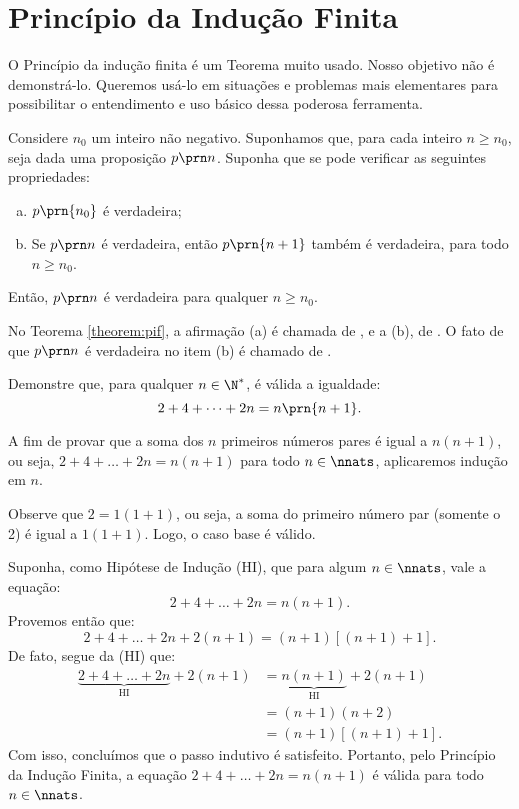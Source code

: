 \section{Princípio da Indução Finita}

O Princípio da indução finita é um Teorema muito usado. Nosso objetivo não é demonstrá-lo. Queremos usá-lo em situações e problemas mais elementares para possibilitar o entendimento e uso básico dessa poderosa ferramenta.

\begin{theorem}
\label{theorem:pif}
Considere $n_0$ um inteiro não negativo. Suponhamos que, para cada inteiro $n \geq n_0$, seja dada uma proposição $p \prn n$. Suponha
que se pode verificar as seguintes propriedades:

\begin{enumerate}[(a)]
  \item $p \prn{n_0}$ é verdadeira;
  \item Se $p \prn n$ é verdadeira, então $p \prn {n+1}$ também
  é verdadeira, para todo $n \geq n_0$.
\end{enumerate}

\noindent Então, $p \prn n$ é verdadeira para qualquer $n \geq n_0$.
\end{theorem}

\begin{remark}
No Teorema \ref{theorem:pif}, a afirmação (a) é chamada de , e a (b), de . O fato de que $p \prn n$ é verdadeira no item (b) é chamado de .
\end{remark}

\begin{example}
Demonstre que, para qualquer $n \in \N^*$, é válida a igualdade:
%
$$2+ 4+ \dots + 2n = n \prn {n+1}.$$
\end{example}


\begin{solution}
	A fim de provar que a soma dos $n$ primeiros números pares é igual a $n(n+1)$, ou seja, $2+4+\dots + 2n = n(n+1)$ para todo $n \in \nnats$, aplicaremos indução em $n$.
	
	Observe que $2 = 1(1+1)$, ou seja, a soma do primeiro número par (somente o 2) é igual a $1(1+1)$. Logo, o caso base é válido.
	
	Suponha, como Hipótese de Indução (HI), que para algum $n \in \nnats$, vale a equação:
	$$2+4+\dots+2n=n(n+1).$$
	Provemos então que:
	$$2+4+\dots + 2n + 2(n+1) = (n+1)[(n+1)+1].$$
	De fato, segue da (HI) que:
	\begin{align*}
	\underbrace{2+4+\dots+2n}_{\text{HI}} +2(n+1)	&= \underbrace{n(n+1)}_{\text{HI}} + 2(n+1) \\
	&= (n+1)(n+2) \\
	&= (n+1)[(n+1)+1].
	\end{align*}
	Com isso, concluímos que o passo indutivo é satisfeito.
	Portanto, pelo Princípio da Indução Finita, a equação $2+4+\dots + 2n=n(n+1)$ é válida para todo $n \in \nnats$.
	\end{solution}


